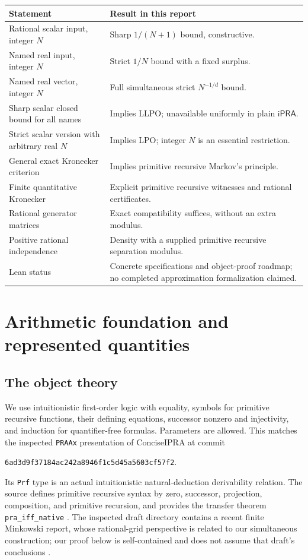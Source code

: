 \documentclass[11pt]{article}
\theoremstyle{definition}\newtheorem{definition}[theorem]{Definition}
\theoremstyle{remark}\newtheorem{remark}[theorem]{Remark}
\newcommand{\ipra}{\mathsf{iPRA}}\newcommand{\HA}{\mathsf{HA}}
\begin{document}
\begin{center}\small
\begin{tabular}{>{\raggedright\arraybackslash}p{}>{\raggedright\arraybackslash}p{}}
\toprule
Statement & Result in this report\\
\midrule
Rational scalar input, integer $N$ & Sharp $1/(N+1)$ bound, constructive.\\
Named real input, integer $N$ & Strict $1/N$ bound with a fixed surplus.\\
Named real vector, integer $N$ & Full simultaneous strict $N^{-1/d}$ bound.\\
Sharp scalar closed bound for all names & Implies LLPO; unavailable uniformly in plain $\ipra$.\\
Strict scalar version with arbitrary real $N$ & Implies LPO; integer $N$ is an essential restriction.\\
General exact Kronecker criterion & Implies primitive recursive Markov's principle.\\
Finite quantitative Kronecker & Explicit primitive recursive witnesses and rational certificates.\\
Rational generator matrices & Exact compatibility suffices, without an extra modulus.\\
Positive rational independence & Density with a supplied primitive recursive separation modulus.\\
Lean status & Concrete specifications and object-proof roadmap; no completed approximation formalization claimed.\\
\bottomrule
\end{tabular}
\end{center}

\section{Arithmetic foundation and represented quantities}\label{sec:foundation}

\subsection{The object theory}

We use intuitionistic first-order logic with equality, symbols for primitive recursive functions, their defining equations, successor nonzero and injectivity, and induction for quantifier-free formulas. Parameters are allowed. This matches the inspected \texttt{PRAAx} presentation of ConciseIPRA at commit
\begin{center}\small\texttt{6ad3d9f37184ac242a8946f1c5d45a5603cf57f2}.\end{center}
Its \texttt{Prf} type is an actual intuitionistic natural-deduction derivability relation. The source defines primitive recursive syntax by zero, successor, projection, composition, and primitive recursion, and provides the transfer theorem \texttt{pra\_iff\_native} \cite{proveit-pr,proveit-deduction,proveit-native}. The inspected draft directory contains a recent finite Minkowski report, whose rational-grid perspective is related to our simultaneous construction; our proof below is self-contained and does not assume that draft's conclusions \cite{proveit-drafts}.
\end{document}
